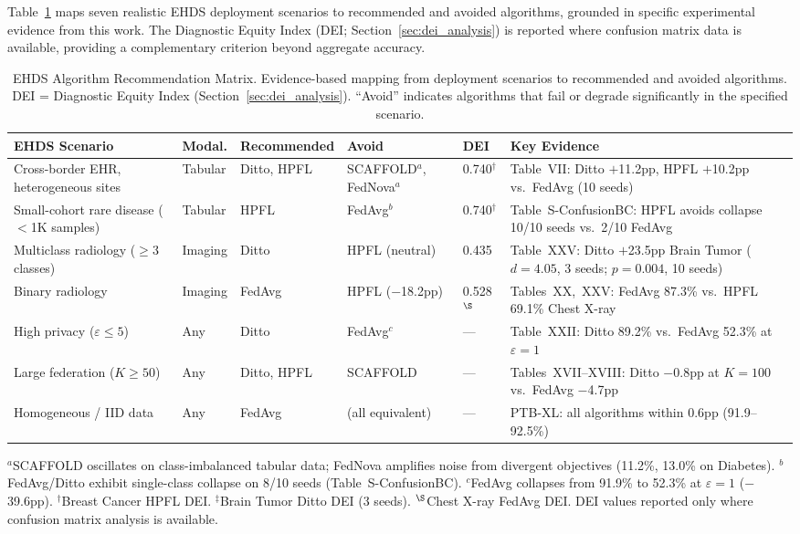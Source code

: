 \documentclass[conference]{IEEEtran}
\begin{document}
Table~\ref{tab:algo_recommendation} maps seven realistic EHDS deployment scenarios to recommended and avoided algorithms, grounded in specific experimental evidence from this work. The Diagnostic Equity Index (DEI; Section~\ref{sec:dei_analysis}) is reported where confusion matrix data is available, providing a complementary criterion beyond aggregate accuracy.

\begin{table}[htbp]
\centering
\caption{EHDS Algorithm Recommendation Matrix. Evidence-based mapping from deployment scenarios to recommended and avoided algorithms. DEI = Diagnostic Equity Index (Section~\ref{sec:dei_analysis}). ``Avoid'' indicates algorithms that fail or degrade significantly in the specified scenario.}
\label{tab:algo_recommendation}
\small
\begin{tabular}{p{3.2cm}p{1.2cm}p{2.0cm}p{2.5cm}p{0.8cm}p{4.8cm}}
\toprule
\textbf{EHDS Scenario} & \textbf{Modal.} & \textbf{Recommended} & \textbf{Avoid} & \textbf{DEI} & \textbf{Key Evidence} \\
\midrule
Cross-border EHR, heterogeneous sites & Tabular & Ditto, HPFL & SCAFFOLD$^a$, FedNova$^a$ & 0.740$^\dagger$ & Table~VII: Ditto $+$11.2pp, HPFL $+$10.2pp vs.\ FedAvg (10 seeds) \\
\addlinespace
Small-cohort rare disease ($<$1K samples) & Tabular & HPFL & FedAvg$^b$ & 0.740$^\dagger$ & Table~S-ConfusionBC: HPFL avoids collapse 10/10 seeds vs.\ 2/10 FedAvg \\
\addlinespace
Multiclass radiology ($\geq$3 classes) & Imaging & Ditto & HPFL (neutral) & 0.435 & Table~XXV: Ditto $+$23.5pp Brain Tumor ($d{=}4.05$, 3 seeds; $p{=}0.004$, 10 seeds) \\
\addlinespace
Binary radiology & Imaging & FedAvg & HPFL ($-$18.2pp) & 0.528$^\S$ & Tables~XX,~XXV: FedAvg 87.3\% vs.\ HPFL 69.1\% Chest X-ray \\
\addlinespace
High privacy ($\varepsilon \leq 5$) & Any & Ditto & FedAvg$^c$ & --- & Table~XXII: Ditto 89.2\% vs.\ FedAvg 52.3\% at $\varepsilon{=}1$ \\
\addlinespace
Large federation ($K \geq 50$) & Any & Ditto, HPFL & SCAFFOLD & --- & Tables~XVII--XVIII: Ditto $-$0.8pp at $K{=}100$ vs.\ FedAvg $-$4.7pp \\
\addlinespace
Homogeneous / IID data & Any & FedAvg & (all equivalent) & --- & PTB-XL: all algorithms within 0.6pp (91.9--92.5\%) \\
\bottomrule
\end{tabular}

\vspace{1mm}
\footnotesize{$^a$SCAFFOLD oscillates on class-imbalanced tabular data; FedNova amplifies noise from divergent objectives (11.2\%, 13.0\% on Diabetes). $^b$FedAvg/Ditto exhibit single-class collapse on 8/10 seeds (Table~S-ConfusionBC). $^c$FedAvg collapses from 91.9\% to 52.3\% at $\varepsilon{=}1$ ($-$39.6pp). $^\dagger$Breast Cancer HPFL DEI. $^\ddagger$Brain Tumor Ditto DEI (3 seeds). $^\S$Chest X-ray FedAvg DEI. DEI values reported only where confusion matrix analysis is available.}
\end{table}
\end{document}
